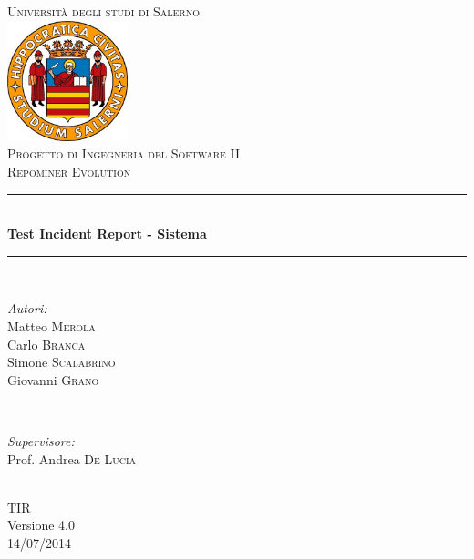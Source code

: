 \documentclass[a4paper, 12pt, italian]{report}
\begin{document}
\begin{titlepage}
\newcommand{\HRule}{\rule{\linewidth}{0.5mm}} 
\center 
\textsc{\LARGE Università degli studi di Salerno}\\[1cm] 
\includegraphics[width=3.5cm]{img/logo.jpg} \\[1cm]
\textsc{\large Progetto di Ingegneria del Software II}\\[0.5cm]
\textsc{\Large Repominer Evolution}\\[0.5cm] 
 \HRule \\[0.4cm]
{ \large \bfseries Test Incident Report - Sistema}\\[0.4cm] 
\HRule \\[1.5cm]

\begin{minipage}{0.4\textwidth}
\begin{flushleft} \large
\emph{Autori:}\\
Matteo \textsc{Merola}\\
Carlo \textsc{Branca}\\
Simone \textsc{Scalabrino}\\
Giovanni \textsc{Grano}\\
\end{flushleft}
\end{minipage}
~
\begin{minipage}{0.4\textwidth}
\begin{flushright} \large
\emph{Supervisore:} \\
Prof. Andrea \textsc{De Lucia}
\end{flushright}
\end{minipage}\\[2.5cm]

{\Large TIR}\\
Versione 4.0\\[1cm]

{\large 14/07/2014} %

\vfill

\end{titlepage}		
	
	\setcounter{tocdepth}{1}	
	\tableofcontents
	
	
	
\end{document}

